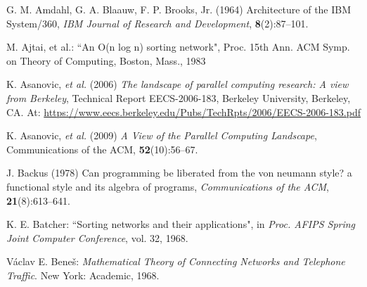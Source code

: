 {\small

\begin{thebibliography}{}


 G. M. Amdahl, G. A. Blaauw, F. P. Brooks, Jr. (1964)  Architecture of the IBM System/360, {\em IBM Journal of Research and Development}, {\bf 8}(2):87--101.



 M. Ajtai, et al.: ``An O(n log n) sorting network", Proc. 15th Ann. ACM Symp. on Theory of Computing, Boston, Mass., 1983

 K. Asanovic, {\em et al.} (2006) {\em The landscape of parallel computing research: A view from Berkeley}, Technical Report EECS-2006-183, Berkeley University, Berkeley, CA. At: \url{https://www.eecs.berkeley.edu/Pubs/TechRpts/2006/EECS-2006-183.pdf}

 K. Asanovic,  {\em et al.} (2009) {\em A View of the Parallel Computing Landscape}, Communications of the
    ACM, {\bf 52}(10):56--67.

 J. Backus (1978) Can programming be liberated from the von neumann style? a functional style and its algebra of programs, {\em Communications of the ACM}, {\bf 21}(8):613--641.

 K. E. Batcher: ``Sorting networks and their applications", in {\em Proc. AFIPS Spring Joint Computer Conference}, vol. 32, 1968.

 V\' aclav E. Bene\v s: {\em Mathematical Theory of Connecting Networks and Telephone Traffic}. New York: Academic, 1968.




\end{thebibliography}}
